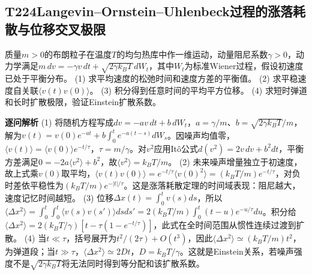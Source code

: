\subsection*{T224\quad Langevin–Ornstein–Uhlenbeck过程的涨落耗散与位移交叉极限}
质量$m>0$的布朗粒子在温度$T$的均匀热库中作一维运动，动量阻尼系数$\gamma>0$，动力学满足$m\,dv=-\gamma v\,dt+\sqrt{2\gamma k_BT}\,dW_t$，其中$W_t$为标准Wiener过程，假设初速度已处于平衡分布。
(1) 求平均速度的松弛时间和速度方差的平衡值。
(2) 求平稳速度自关联$\langle v(t)v(0)\rangle$。
(3) 积分得到任意时间的平均平方位移。
(4) 求短时弹道和长时扩散极限，验证Einstein扩散系数。
\par\textbf{逐问解析}
(1) 将随机方程写成$dv=-av\,dt+b\,dW_t$，$a=\gamma/m$、$b=\sqrt{2\gamma k_BT}/m$，解为$v(t)=v(0)e^{-at}+b\int_0^te^{-a(t-s)}dW_s$。因噪声均值零，$\langle v(t)\rangle=\langle v(0)\rangle e^{-t/\tau}$，$\tau=m/\gamma$。对$v^2$应用Itô公式$d(v^2)=2v\,dv+b^2dt$，平衡方差满足$0=-2a\langle v^2\rangle+b^2$，故$\langle v^2\rangle=k_BT/m$。
(2) 未来噪声增量独立于初速度，故上式乘$v(0)$取平均，$\langle v(t)v(0)\rangle=e^{-t/\tau}\langle v(0)^2\rangle=(k_BT/m)e^{-t/\tau}$，对负时差依平稳性为$(k_BT/m)e^{-|t|/\tau}$。这是涨落耗散定理的时间域表现：阻尼越大，速度记忆时间越短。
(3) 位移$\Delta x(t)=\int_0^t v(s)ds$，所以$\langle\Delta x^2\rangle=\int_0^t\int_0^t\langle v(s)v(s')\rangle dsds'=2(k_BT/m)\int_0^t(t-u)e^{-u/\tau}du$。积分给$\langle\Delta x^2\rangle=2(k_BT/\gamma)[t-\tau(1-e^{-t/\tau})]$，此式在全时间范围从惯性连续过渡到扩散。
(4) 当$t\ll\tau$，括号展开为$t^2/(2\tau)+O(t^3)$，因此$\langle\Delta x^2\rangle\simeq(k_BT/m)t^2$，为弹道段；当$t\gg\tau$，$\langle\Delta x^2\rangle\simeq2Dt$，$D=k_BT/\gamma$。这就是Einstein关系，若噪声强度不是$\sqrt{2\gamma k_BT}$将无法同时得到等分配和该扩散系数。
\par\medskip
